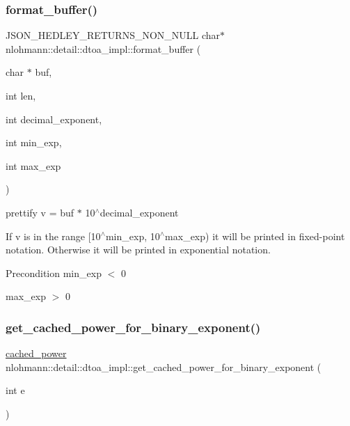 \subsubsection{\texorpdfstring{format\+\_\+buffer()}{format\_buffer()}}
{\footnotesize\ttfamily J\+S\+O\+N\+\_\+\+H\+E\+D\+L\+E\+Y\+\_\+\+R\+E\+T\+U\+R\+N\+S\+\_\+\+N\+O\+N\+\_\+\+N\+U\+LL char$\ast$ nlohmann\+::detail\+::dtoa\+\_\+impl\+::format\+\_\+buffer (\begin{DoxyParamCaption}\item[{char $\ast$}]{buf,  }\item[{int}]{len,  }\item[{int}]{decimal\+\_\+exponent,  }\item[{int}]{min\+\_\+exp,  }\item[{int}]{max\+\_\+exp }\end{DoxyParamCaption})\hspace{0.3cm}{\ttfamily [inline]}}



prettify v = buf $\ast$ 10$^\wedge$decimal\+\_\+exponent 

If v is in the range \mbox{[}10$^\wedge$min\+\_\+exp, 10$^\wedge$max\+\_\+exp) it will be printed in fixed-\/point notation. Otherwise it will be printed in exponential notation.

\begin{DoxyPrecond}{Precondition}
min\+\_\+exp $<$ 0 

max\+\_\+exp $>$ 0 
\end{DoxyPrecond}
\mbox{\label{namespacenlohmann_1_1detail_1_1dtoa__impl_adbf329a18c5cf854a3477327afd2200b}} 
\subsubsection{\texorpdfstring{get\+\_\+cached\+\_\+power\+\_\+for\+\_\+binary\+\_\+exponent()}{get\_cached\_power\_for\_binary\_exponent()}}
{\footnotesize\ttfamily \mbox{\hyperlink{structnlohmann_1_1detail_1_1dtoa__impl_1_1cached__power}{cached\+\_\+power}} nlohmann\+::detail\+::dtoa\+\_\+impl\+::get\+\_\+cached\+\_\+power\+\_\+for\+\_\+binary\+\_\+exponent (\begin{DoxyParamCaption}\item[{int}]{e }\end{DoxyParamCaption})\hspace{0.3cm}{\ttfamily [inline]}}

